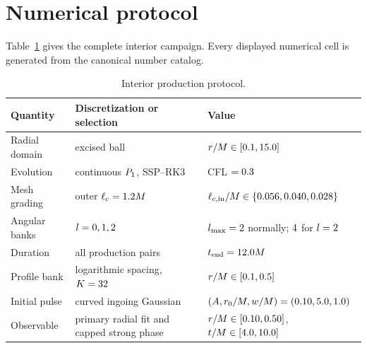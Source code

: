 \documentclass[
  aps,
  prd,
  reprint,
  superscriptaddress,
  nofootinbib,
  longbibliography
]{revtex4-2}
\begin{document}
\section{Numerical protocol}
\label{app:numerical-protocol}

Table~\ref{tab:interior-protocol} gives the complete interior campaign.
Every displayed numerical cell is generated from the canonical number
catalog.

\begin{table}
  \caption{Interior production protocol.}
  \label{tab:interior-protocol}
  \begin{tabular}{lll}
    \toprule
    Quantity & Discretization or selection & Value \\
    \midrule
    Radial domain & excised ball
      & $r/M\in[0.1,15.0]$ \\
    Evolution & continuous $P_{1}$, SSP--RK3
      & CFL $=0.3$ \\
    Mesh grading & outer $\ell_c=1.2 M$
      & $\ell_{c,\rm in}/M\in
      \{0.056,0.040,
      0.028\}$ \\
    Angular banks & $l=0,1,2$
      & $l_{\max}=2$ normally;
        $4$ for $l=2$ \\
    Duration & all production pairs & $t_{\rm end}=12.0 M$ \\
    Profile bank & logarithmic spacing, $K=32$
      & $r/M\in[0.1,
      0.5]$ \\
    Initial pulse & curved ingoing Gaussian
      & $(A,r_0/M,w/M)=(0.10,5.0,1.0)$ \\
    Observable & primary radial fit and capped strong phase
      & $r/M\in[0.10,0.50]$,
        $t/M\in[4.0,10.0]$ \\
    \bottomrule
  \end{tabular}
\end{table}
\end{document}
